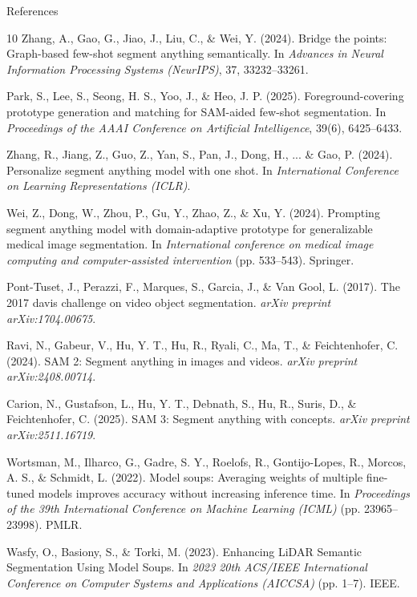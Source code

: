 \documentclass[aspectratio=169, 10pt]{beamer}
\begin{document}
\begin{frame}[allowframebreaks]{References}
\begin{thebibliography}{10}
Zhang, A., Gao, G., Jiao, J., Liu, C., \& Wei, Y. (2024).
Bridge the points: Graph-based few-shot segment anything semantically.
In \textit{Advances in Neural Information Processing Systems (NeurIPS)}, 37, 33232--33261.

Park, S., Lee, S., Seong, H. S., Yoo, J., \& Heo, J. P. (2025).
Foreground-covering prototype generation and matching for SAM-aided few-shot segmentation.
In \textit{Proceedings of the AAAI Conference on Artificial Intelligence}, 39(6), 6425--6433.

Zhang, R., Jiang, Z., Guo, Z., Yan, S., Pan, J., Dong, H., ... \& Gao, P. (2024). 
Personalize segment anything model with one shot.
In \textit{International Conference on Learning Representations (ICLR)}.

Wei, Z., Dong, W., Zhou, P., Gu, Y., Zhao, Z., \& Xu, Y. (2024). 
Prompting segment anything model with domain-adaptive prototype for generalizable medical image segmentation. 
In \textit{International conference on medical image computing and computer-assisted intervention} (pp. 533--543). Springer.

Pont-Tuset, J., Perazzi, F., Marques, S., Garcia, J., \& Van Gool, L. (2017). 
The 2017 davis challenge on video object segmentation. 
\textit{arXiv preprint arXiv:1704.00675}.

Ravi, N., Gabeur, V., Hu, Y. T., Hu, R., Ryali, C., Ma, T., \& Feichtenhofer, C. (2024).
SAM 2: Segment anything in images and videos.
\textit{arXiv preprint arXiv:2408.00714}.

Carion, N., Gustafson, L., Hu, Y. T., Debnath, S., Hu, R., Suris, D., \& Feichtenhofer, C. (2025).
SAM 3: Segment anything with concepts.
\textit{arXiv preprint arXiv:2511.16719}.

Wortsman, M., Ilharco, G., Gadre, S. Y., Roelofs, R., Gontijo-Lopes, R., Morcos, A. S., \& Schmidt, L. (2022).
Model soups: Averaging weights of multiple fine-tuned models improves accuracy without increasing inference time.
In \textit{Proceedings of the 39th International Conference on Machine Learning (ICML)} (pp. 23965--23998). PMLR.

Wasfy, O., Basiony, S., \& Torki, M. (2023).
Enhancing LiDAR Semantic Segmentation Using Model Soups.
In \textit{2023 20th ACS/IEEE International Conference on Computer Systems and Applications (AICCSA)} (pp. 1--7). IEEE.


 \end{thebibliography}
\end{frame}
\end{document}
